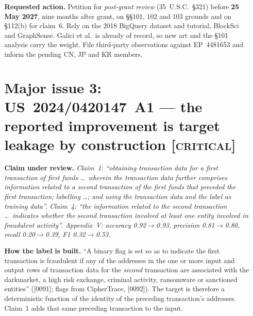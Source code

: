 \documentclass[10pt,a4paper]{article}
\newcommand{\claim}[1]{\noindent\textbf{Claim under review.} \emph{#1}\par\smallskip}
\newcommand{\sev}[1]{\textsc{\color{BrickRed}[#1]}}
\newcommand{\act}[1]{\noindent\textbf{Requested action.} #1\par}
\begin{document}
\act{Petition for \emph{post-grant review} (35~U.S.C.~\S321) before \textbf{25 May 2027}, nine months after grant, on \S\S101, 102 and 103 grounds and on \S112(b) for claim~6. Rely on the 2018 BigQuery dataset and tutorial, BlockSci and GraphSense. Galici et al.\ is already of record, so new art and the \S101 analysis carry the weight. File third-party observations against EP~4481653 and inform the pending CN, JP and KR members.}

\section{Major issue 3: US~2024/0420147~A1 --- the reported improvement is target leakage by construction \sev{critical}}\label{sec:fraud}
\claim{Claim~1: ``obtaining transaction data for a first transaction of first funds \ldots\ wherein the transaction data further comprises information related to a second transaction of the first funds that preceded the first transaction; labelling \ldots; and using the transaction data and the label as training data''. Claim~4: ``the information related to the second transaction \ldots\ indicates whether the second transaction involved at least one entity involved in fraudulent activity''. Appendix~V: accuracy 0.92$\rightarrow$0.93, precision 0.81$\rightarrow$0.80, recall 0.20$\rightarrow$0.39, F1 0.32$\rightarrow$0.53.}

\noindent\textbf{How the label is built.} ``A binary flag is set so as to indicate the first transaction is fraudulent if any of the addresses in the one or more input and output rows of transaction data for the \emph{second} transaction are associated with the darkmarket, a high risk exchange, criminal activity, ransomware or sanctioned entities'' ([0091]; flags from CipherTrace, [0092]). The target is therefore a deterministic function of the identity of the preceding transaction's addresses. Claim~1 adds that same preceding transaction to the input.
\end{document}
